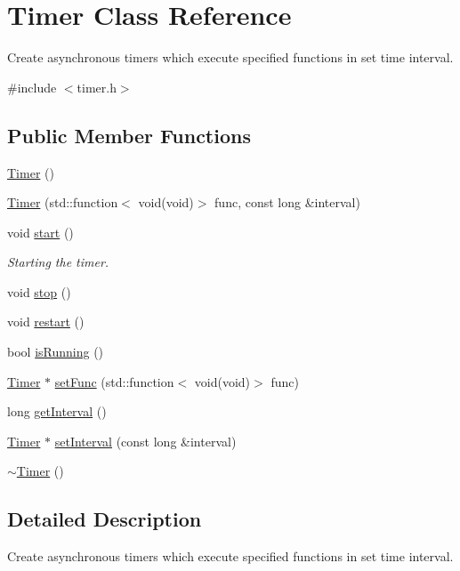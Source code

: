 \hypertarget{classTimer}{}\section{Timer Class Reference}
\label{classTimer}


Create asynchronous timers which execute specified functions in set time interval.  




{\ttfamily \#include $<$timer.\+h$>$}

\subsection*{Public Member Functions}
\begin{DoxyCompactItemize}
\item 
\hyperlink{classTimer_a5f16e8da27d2a5a5242dead46de05d97}{Timer} ()
\item 
\hyperlink{classTimer_a6e5fa1d67967d471f368218e1d0ae807}{Timer} (std\+::function$<$ void(void)$>$ func, const long \&interval)
\item 
void \hyperlink{classTimer_a3a8b5272198d029779dc9302a54305a8}{start} ()
\begin{DoxyCompactList}\small\item\em Starting the timer. \end{DoxyCompactList}\item 
void \hyperlink{classTimer_a63f0eb44b27402196590a03781515dba}{stop} ()
\item 
void \hyperlink{classTimer_aa3f7871196bb56202af2bc982bfbfff6}{restart} ()
\item 
bool \hyperlink{classTimer_a2ef50bfc604ea9fb88d3000c9ad0edd9}{is\+Running} ()
\item 
\hyperlink{classTimer}{Timer} $\ast$ \hyperlink{classTimer_a70653847aa7ae39d66379597e37db6af}{set\+Func} (std\+::function$<$ void(void)$>$ func)
\item 
long \hyperlink{classTimer_a0da8462797c35f5a91e7246eeed32198}{get\+Interval} ()
\item 
\hyperlink{classTimer}{Timer} $\ast$ \hyperlink{classTimer_abdc4f70c2dc58ee37b62861c842b77f0}{set\+Interval} (const long \&interval)
\item 
\hyperlink{classTimer_a14fa469c4c295c5fa6e66a4ad1092146}{$\sim$\+Timer} ()
\end{DoxyCompactItemize}


\subsection{Detailed Description}
Create asynchronous timers which execute specified functions in set time interval. 


